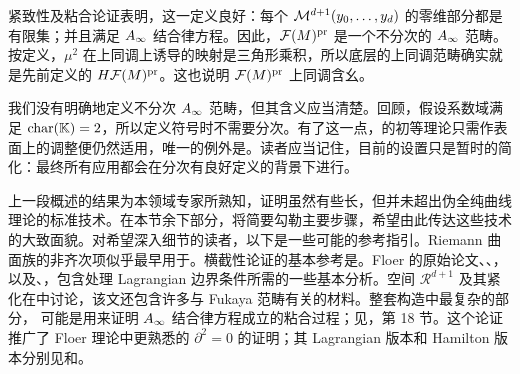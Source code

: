 紧致性及粘合论证表明，这一定义良好：每个 $\mathcal M^{d+1}(y_0,\ldots,y_d)$ 的零维部分都是有限集；并且满足 $A_\infty$ 结合律方程。因此，$\mathcal F(M)^{\mathrm{pr}}$ 是一个不分次的 $A_\infty$ 范畴。按定义，$\mu^2$ 在上同调上诱导的映射是三角形乘积，所以底层的上同调范畴确实就是先前定义的 $H\mathcal F(M)^{\mathrm{pr}}$。这也说明 $\mathcal F(M)^{\mathrm{pr}}$ 上同调含幺。

\begin{note}\label{st:9.7}
我们没有明确地定义不分次 $A_\infty$ 范畴，但其含义应当清楚。回顾，假设系数域满足 $\operatorname{char}(\mathbb K)=2$，所以定义符号时不需要分次。有了这一点，的初等理论只需作表面上的调整便仍然适用，唯一的例外是。读者应当记住，目前的设置只是暂时的简化：最终所有应用都会在分次有良好定义的背景下进行。
\end{note}

\begin{note}\label{st:9.8}
上一段概述的结果为本领域专家所熟知，证明虽然有些长，但并未超出伪全纯曲线理论的标准技术。在本节余下部分，将简要勾勒主要步骤，希望由此传达这些技术的大致面貌。对希望深入细节的读者，以下是一些可能的参考指引。Riemann 曲面族的非齐次项似乎最早用于。横截性论证的基本参考是。Floer 的原始论文、、，以及、，包含处理 Lagrangian 边界条件所需的一些基本分析。空间 $\mathcal R^{d+1}$ 及其紧化在中讨论，该文还包含许多与 Fukaya 范畴有关的材料。整套构造中最复杂的部分，
可能是用来证明 $A_\infty$ 结合律方程成立的粘合过程；见，第 18 节。这个论证推广了 Floer 理论中更熟悉的 $\partial^2=0$ 的证明；其 Lagrangian 版本和 Hamilton 版本分别见和。
\end{note}

